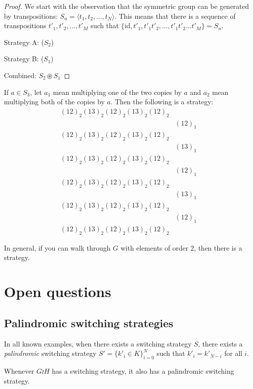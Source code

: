 \begin{proof}
  We start with the observation that the symmetric group can be generated by
  transpositions: $S_n = \langle t_1, t_2, \dots, t_N\rangle$.
  This means that there is a sequence of transpositions $t'_1, t'_2, \dots, t'_M$
  such that $\{\mathrm{id}, t'_1, t'_1t'_2, \dots, t'_1t'_2\dots t'_M\} = S_n$.

  Strategy A: ($S_2$)

  Strategy B: ($S_1$)

  Combined: $S_2 \circledast S_1$
\end{proof}
\begin{example}
  If $a \in S_3$, let $a_1$ mean multiplying one of the two copies by $a$ and
  $a_2$ mean multiplying both of the copies by $a$. Then the following is
  a strategy:
  \begin{align*}
    (12)_2(13)_2(12)_2(13)_2(12)_2 \\
    &(12)_1 \\
    (12)_2(13)_2(12)_2(13)_2(12)_2 \\
    &(13)_1 \\
    (12)_2(13)_2(12)_2(13)_2(12)_2 \\
    &(12)_1 \\
    (12)_2(13)_2(12)_2(13)_2(12)_2 \\
    &(13)_1 \\
    (12)_2(13)_2(12)_2(13)_2(12)_2 \\
    &(12)_1 \\
    (12)_2(13)_2(12)_2(13)_2(12)_2
  \end{align*}
  \label{ex:TwoSymmetricGroups}
\end{example}
In general, if you can walk through $G$ with elements of order $2$, then
there is a strategy.
%
%
\section{Open questions}
\label{sec:OpenQuestions}
\subsection{Palindromic switching strategies}
In all known examples, when there exists a switching strategy $S$,
there exists a \textit{palindromic} switching strategy
$S' = \{k'_i \in K\}_{i=0}^N$
such that $k'_i = k'_{N-i}$ for all $i$.
\begin{conjecture}
  Whenever $G \wr H$ has a switching strategy, it also has a palindromic switching
  strategy.
\end{conjecture}

